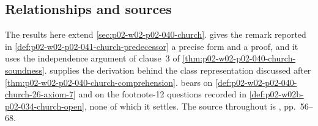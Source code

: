 \subsection{Relationships and sources}

The results here extend \cref{sec:p02-w02-p02-040-church}.
 gives the remark
reported in \cref{def:p02-w02-p02-041-church-predecessor} a precise form
and a proof, and it uses the independence argument of clause~3 of
\cref{thm:p02-w02-p02-040-church-soundness}.
 supplies the derivation behind the
class representation discussed after \cref{thm:p02-w02-p02-040-church-comprehension}.
 bears on
\cref{def:p02-w02-p02-040-church-26-axiom-7} and on the footnote-12
questions recorded in \cref{def:p02-w02b-p02-034-church-open}, none of
which it settles.  The source throughout is \cite{Church1940}, pp.~56--68.
